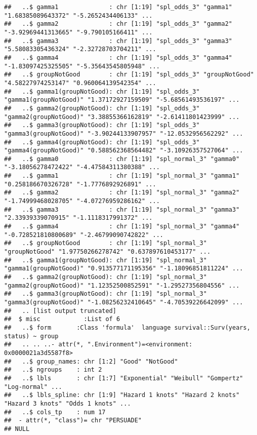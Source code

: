 \documentclass[
]{article}
\begin{document}
\begin{verbatim}
##   ..$ gamma1              : chr [1:19] "spl_odds_3" "gamma1" "1.68385089643372" "-5.2652434406133" ...
##   ..$ gamma2              : chr [1:19] "spl_odds_3" "gamma2" "-3.92969441313665" "-9.790105166411" ...
##   ..$ gamma3              : chr [1:19] "spl_odds_3" "gamma3" "5.58083305436324" "-2.32728703704211" ...
##   ..$ gamma4              : chr [1:19] "spl_odds_3" "gamma4" "-1.83097425325505" "-5.35643545805948" ...
##   ..$ groupNotGood        : chr [1:19] "spl_odds_3" "groupNotGood" "4.58227974253147" "0.960064139542354" ...
##   ..$ gamma1(groupNotGood): chr [1:19] "spl_odds_3" "gamma1(groupNotGood)" "1.37172927159509" "-5.68561493536197" ...
##   ..$ gamma2(groupNotGood): chr [1:19] "spl_odds_3" "gamma2(groupNotGood)" "3.38855366162819" "-2.61411801423999" ...
##   ..$ gamma3(groupNotGood): chr [1:19] "spl_odds_3" "gamma3(groupNotGood)" "-3.90244133907957" "-12.0532956562292" ...
##   ..$ gamma4(groupNotGood): chr [1:19] "spl_odds_3" "gamma4(groupNotGood)" "0.588562368564482" "-3.10926357527064" ...
##   ..$ gamma0              : chr [1:19] "spl_normal_3" "gamma0" "-3.18056278472422" "-4.47584311380388" ...
##   ..$ gamma1              : chr [1:19] "spl_normal_3" "gamma1" "0.258186670326728" "-1.7776892926891" ...
##   ..$ gamma2              : chr [1:19] "spl_normal_3" "gamma2" "-1.74999468028705" "-4.07276959286162" ...
##   ..$ gamma3              : chr [1:19] "spl_normal_3" "gamma3" "2.33939339070915" "-1.1118317991372" ...
##   ..$ gamma4              : chr [1:19] "spl_normal_3" "gamma4" "-0.728521810800689" "-2.46799090742822" ...
##   ..$ groupNotGood        : chr [1:19] "spl_normal_3" "groupNotGood" "1.97750266278742" "0.637897610453177" ...
##   ..$ gamma1(groupNotGood): chr [1:19] "spl_normal_3" "gamma1(groupNotGood)" "0.913577171195356" "-1.18096851811224" ...
##   ..$ gamma2(groupNotGood): chr [1:19] "spl_normal_3" "gamma2(groupNotGood)" "1.12352500852591" "-1.29527356804556" ...
##   ..$ gamma3(groupNotGood): chr [1:19] "spl_normal_3" "gamma3(groupNotGood)" "-1.08256232410645" "-4.70539226642099" ...
##   .. [list output truncated]
##  $ misc            :List of 6
##   ..$ form       :Class 'formula'  language survival::Surv(years, status) ~ group
##   .. .. ..- attr(*, ".Environment")=<environment: 0x0000021a3d5587f8> 
##   ..$ group_names: chr [1:2] "Good" "NotGood"
##   ..$ ngroups    : int 2
##   ..$ lbls       : chr [1:7] "Exponential" "Weibull" "Gompertz" "Log-normal" ...
##   ..$ lbls_spline: chr [1:9] "Hazard 1 knots" "Hazard 2 knots" "Hazard 3 knots" "Odds 1 knots" ...
##   ..$ cols_tp    : num 17
##  - attr(*, "class")= chr "PERSUADE"
## NULL
\end{verbatim}
\end{document}
